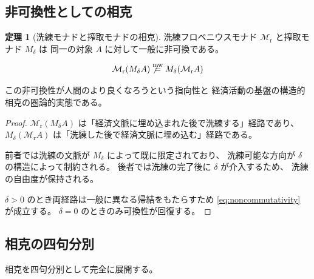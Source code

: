 \documentclass[11pt,a4paper]{article}
\theoremstyle{definition}
\newtheorem{theorem}{定理}[section]
\newcommand{\mweq}{\mathrel{\overset{\mathrm{mw}}{=}}}
\newcommand{\Mr}{\mathcal{M}_{\mathrm{r}}}
\newcommand{\Md}{M_{\delta}}
\begin{document}
\subsection{非可換性としての相克}

\begin{theorem}[洗練モナドと搾取モナドの相克]
洗練フロベニウスモナド $\Mr$ と搾取モナド $\Md$ は
同一の対象 $A$ に対して一般に非可換である。

\begin{equation}
\Mr(\Md A) \not\mweq \Md(\Mr A)
\label{eq:noncommutativity}
\end{equation}

この非可換性が人間のより良くなろうという指向性と
経済活動の基盤の構造的相克の圏論的実態である。
\end{theorem}

\begin{proof}
$\Mr(\Md A)$ は「経済文脈に埋め込まれた後で洗練する」経路であり、
$\Md(\Mr A)$ は「洗練した後で経済文脈に埋め込む」経路である。

前者では洗練の文脈が $\Md$ によって既に限定されており、
洗練可能な方向が $\delta$ の構造によって制約される。
後者では洗練の完了後に $\delta$ が介入するため、
洗練の自由度が保持される。

$\delta > 0$ のとき両経路は一般に異なる帰結をもたらすため
\eqref{eq:noncommutativity} が成立する。
$\delta = 0$ のときのみ可換性が回復する。
\end{proof}

\subsection{相克の四句分別}

相克を四句分別として完全に展開する。
\end{document}
